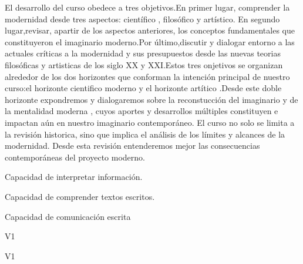 ﻿\begin{syllabus}


\begin{justification}
El desarrollo del curso obedece a tres objetivos.En primer lugar, comprender la modernidad desde tres aspectos: científico , filosófico y artístico.
En segundo lugar,revisar, apartir de los aspectos anteriores, los conceptos fundamentales que constituyeron el imaginario moderno.Por último,discutir y 
dialogar entorno a las actuales críticas a la modernidad y sus presupuestos desde las nuevas teorias filosóficas y artisticas de los siglo XX y XXI.Estos
tres onjetivos se organizan alrededor de los dos horizontes que conforman la intención principal de nuestro curso:el horizonte cientifico moderno y el horizonte
artítico .Desde este doble horizonte expondremos y dialogaremos sobre la reconstucción del imaginario y de la mentalidad moderna , cuyos aportes y desarrollos 
múltiples constituyen e impactan aún en nuestro imaginario contemporáneo. El curso no solo se limita a la revisión historica, sino que implica el análisis de los
límites y alcances de la modernidad. Desde esta revisión entenderemos mejor las consecuencias contemporáneas del proyecto moderno.

\end{justification}

\begin{goals}
\item Capacidad de interpretar información.
\item Capacidad de comprender textos escritos.
\item Capacidad de comunicación escrita
\end{goals}

\begin{outcomes}{V1}
    \item {} %
    \item {} %
    \item {} %
    \item {} %
\end{outcomes}

\begin{competences}{V1}
    \item {}
    \item {}
    \item {}
    \item {}
\end{competences}


\end{syllabus}
